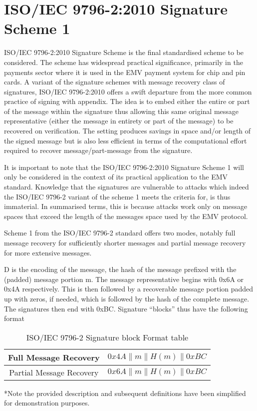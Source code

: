 \documentclass[]{final_report}
\theoremstyle{definition}
\begin{document}
\section{ISO/IEC 9796-2:2010 Signature Scheme 1}
ISO/IEC 9796-2:2010 Signature Scheme is the final standardised scheme to be considered. The scheme has widespread practical significance, primarily in the payments sector where it is used in the EMV payment system for chip and pin cards. A variant of the signature schemes with message recovery class of signatures, ISO/IEC 9796-2:2010 offers a swift departure from the more common practice of signing with appendix. The idea is to embed either the entire or part of the message within the signature thus allowing this same original message representative (either the message in entirety or part of the message) to be recovered on verification. The setting produces savings in space and/or length of the signed message but is also less efficient in terms of the computational effort required to recover message/part-message from the signature.

It is important to note that the ISO/IEC 9796-2:2010 Signature Scheme 1 will only be considered in the context of its practical application to the EMV standard. Knowledge that the signatures are vulnerable to attacks which indeed the ISO/IEC 9796-2 variant of the scheme 1 meets the criteria for, is thus immaterial. In summarised terms, this is because attacks work only on message spaces that exceed the length of the messages space used by the EMV protocol.

Scheme 1 from the ISO/IEC 9796-2 standard offers two modes, notably full message recovery for sufficiently shorter messages and partial message recovery for more extensive messages.

D is the encoding of the message, the hash of the message prefixed with the (padded) message portion m. The message representative begins with 0x6A or 0x4A respectively. This is then followed by a recoverable message portion padded up with zeros, if needed, which is followed by the hash of the complete message. The signatures then end with 0xBC. Signature “blocks” thus have the following format

\begin{table}[H]
    \centering
    \begin{tabular}{|c|c|}
    \hline
    Full Message Recovery & $0x4A\|m\|H(m)\|0xBC$ \\
    \hline
    Partial Message Recovery & $0x6A\|m\|H(m)\|0xBC$ \\
    \hline
    \end{tabular}
    \caption{ISO/IEC 9796-2 Signature block Format table}
    \label{tab:sig_block_tab}
\end{table}
*Note the provided description and subsequent definitions have been simplified for demonstration purposes.
\end{document}
